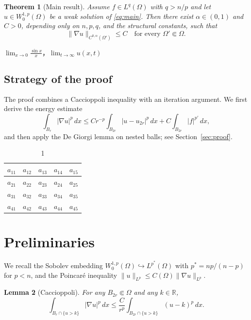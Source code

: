\documentclass[11pt,reqno]{amsart}
\newtheorem{theorem}{Theorem}[section]
\newtheorem{lemma}[theorem]{Lemma}
\theoremstyle{definition}
\newcommand{\R}{\mathbb{R}}
\newcommand{\Om}{\Omega}
\begin{document}
\begin{theorem}[Main result]\label{thm:main}
Assume $f\in L^q(\Om)$ with $q>n/p$ and let $u\in W^{1,p}_0(\Om)$ be a weak
solution of \eqref{eq:main}. Then there exist $\alpha\in(0,1)$ and $C>0$,
depending only on $n,p,q$, and the structural constants, such that
\begin{equation}\label{eq:holder}
  \|\nabla u\|_{C^{0,\alpha}(\Om')} \le C
  \quad\text{for every } \Om'\Subset\Om .
\end{equation}
\end{theorem}
\(\displaystyle \lim_{x\to0}\frac{\sin x}{x}\)，\(\displaystyle \lim_{t\to\infty}u(x,t)\)
\subsection{Strategy of the proof}
The proof combines a Caccioppoli inequality with an iteration argument.
We first derive the energy estimate
\begin{equation}
  \int_{B_r} |\nabla u|^p\,dx
  \le C r^{-p}\int_{B_{2r}} |u-u_{2r}|^p\,dx + C\int_{B_{2r}}|f|^{p'}\,dx ,
\end{equation}
and then apply the De Giorgi lemma on nested balls; see
Section~\ref{sec:proof}.

\begin{table}[htbp]
  \centering
  \caption{1}
  \label{tab:new}
  \begin{tabular}{ccccc}
    \toprule
    $a_{11}$ & $a_{12}$ & $a_{13}$ & $a_{14}$ & $a_{15}$ \\
    \midrule
    $a_{21}$ & $a_{22}$ & $a_{23}$ & $a_{24}$ & $a_{25}$ \\
    $a_{31}$ & $a_{32}$ & $a_{33}$ & $a_{34}$ & $a_{35}$ \\
    $a_{41}$ & $a_{42}$ & $a_{43}$ & $a_{44}$ & $a_{45}$ \\
    \bottomrule
  \end{tabular}
\end{table}\section{Preliminaries}\label{sec:pre}

We recall the Sobolev embedding $W^{1,p}_0(\Om)\hookrightarrow L^{p^*}(\Om)$
with $p^*=np/(n-p)$ for $p<n$, and the Poincaré inequality
$\|u\|_{L^p}\le C(\Om)\|\nabla u\|_{L^p}$.

\begin{lemma}[Caccioppoli]\label{lem:cacc}
For any $B_{2r}\Subset\Om$ and any $k\in\R$,
\begin{equation}
  \int_{B_r\cap\{u>k\}}|\nabla u|^p\,dx
  \le \frac{C}{r^p}\int_{B_{2r}\cap\{u>k\}}(u-k)^p\,dx .
\end{equation}
\end{lemma}
\end{document}
